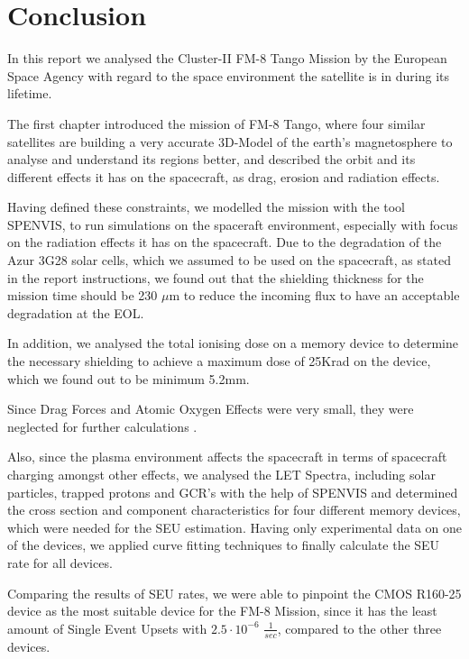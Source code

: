 \section{Conclusion}
In this report we analysed the Cluster-II FM-8 Tango Mission by the European Space Agency with regard to the space environment the satellite is in during its lifetime.

The first chapter introduced the mission of FM-8 Tango, where four similar satellites are building a very accurate 3D-Model of the earth's magnetosphere to analyse and understand its regions better, and described the orbit and its different effects it has on the spacecraft, as drag, erosion and radiation effects.

Having defined these constraints, we modelled the mission with the tool SPENVIS, to run simulations on the spaceraft environment, especially with focus on the radiation effects it has on the spacecraft.
Due to the degradation of the Azur 3G28 solar cells, which we assumed to be used on the spacecraft, as stated in the report instructions, we found out that the shielding thickness for the mission time should be 230 $\mu$m to reduce the incoming flux to have an acceptable degradation at the EOL.

In addition, we analysed the total ionising dose on a memory device to determine the necessary shielding to achieve a maximum dose of 25Krad on the device, which we found out to be minimum 5.2mm.

Since Drag Forces and Atomic Oxygen Effects were very small, they were neglected for further calculations \citep{vallado2008}.

Also, since the plasma environment affects the spacecraft in terms of spacecraft charging amongst other effects, we analysed the LET Spectra, including solar particles, trapped protons and GCR's with the help of SPENVIS and determined the cross section and component characteristics for four different memory devices, which were needed for the SEU estimation.
Having only experimental data on one of the devices, we applied curve fitting techniques to finally calculate the SEU rate for all devices.

Comparing the results of SEU rates, we were able to pinpoint the CMOS R160-25 device as the most suitable device for the FM-8 Mission, since it has the least amount of Single Event Upsets with $2.5 \cdot 10^{-6}$  \( \frac{1}{sec} \), compared to the other three devices.
